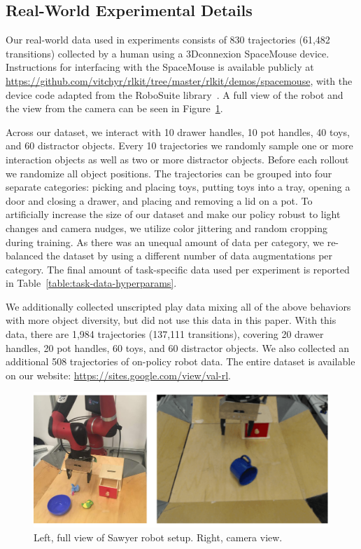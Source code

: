 \subsection{Real-World Experimental Details} \label{sec:appendix_real}

Our real-world data used in experiments consists of 830 trajectories (61,482 transitions) collected by a human using a 3Dconnexion SpaceMouse device. Instructions for interfacing with the SpaceMouse is available publicly at \url{https://github.com/vitchyr/rlkit/tree/master/rlkit/demos/spacemouse}, with the device code adapted from the RoboSuite library~\cite{robosuite2020}. A full view of the robot and the view from the camera can be seen in Figure~\ref{fig:appendix_robot}.

Across our dataset, we interact with 10 drawer handles, 10 pot handles, 40 toys, and 60 distractor objects. Every 10 trajectories we randomly sample one or more interaction objects as well as two or more distractor objects. Before each rollout we randomize all object positions. The trajectories can be grouped into four separate categories: picking and placing toys, putting toys into a tray, opening a door and closing a drawer, and placing and removing a lid on a pot. To artificially increase the size of our dataset and make our policy robust to light changes and camera nudges, we utilize color jittering and random cropping during training. As there was an unequal amount of data per category, we re-balanced the dataset by using a different number of data augmentations per category. The final amount of task-specific data used per experiment is reported in Table~\ref{table:task-data-hyperparams}.

We additionally collected unscripted play data mixing all of the above behaviors with more object diversity, but did not use this data in this paper. With this data, there are 1,984 trajectories (137,111 transitions), covering 20 drawer handles, 20 pot handles, 60 toys, and 60 distractor objects. We also collected an additional 508 trajectories of on-policy robot data. The entire dataset is available on our website: \url{https://sites.google.com/view/val-rl}.

\begin{figure}[b]
  \includegraphics[width=0.9\linewidth]{val/imgs/fig_appendix_robot.pdf}
  \caption{\small
  Left, full view of Sawyer robot setup. Right, camera view.
  }
  \label{fig:appendix_robot}
  \vspace{-0.5cm}
\end{figure}

